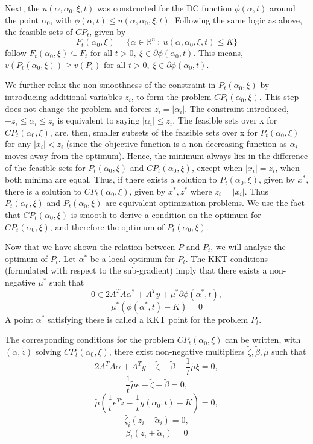 \documentclass[letterpaper, 10 pt, conference]{article}
\begin{document}
Next, the $u(\alpha, \alpha_0, \xi, t)$ was constructed for the DC function $\phi(\alpha, t)$ around the point $\alpha_0$, with $\phi(\alpha, t) \leq u(\alpha, \alpha_0, \xi, t)$. Following the same logic as above, the feasible sets of $CP_t$, given by $$F_t(\alpha_0, \xi) = \{ \alpha \in \mathbb{R}^n \ :\ u(\alpha, \alpha_0, \xi, t) \leq K \}$$ follow $F_t(\alpha_0, \xi) \subseteq F_t \text{ for all } t > 0,\  \xi \in \partial\phi(\alpha_0, t)$. This means, $v(P_t(\alpha_0, \xi)) \geq v(P_t)\text{ for all } t > 0,\  \xi \in \partial\phi(\alpha_0, t)$.

We further relax the non-smoothness of the constraint in $P_t(\alpha_0, \xi)$ by introducing additional variables $z_i$, to form the problem $CP_t(\alpha_0, \xi)$. This step does not change the problem and forces $z_i = |\alpha_i|$. The constraint introduced, $-z_i \leq \alpha_i \leq z_i$ is equivalent to saying $|\alpha_i| \leq z_i$. The feasible sets over x for $CP_t(\alpha_0, \xi)$, are, then, smaller subsets of the feasible sets over x for $P_t(\alpha_0, \xi)$ for any $|x_i| < z_i$ (since the objective function is a non-decreasing function as $\alpha_i$ moves away from the optimum). Hence, the minimum always lies in the difference of the feasible sets for $P_t(\alpha_0, \xi)$ and $CP_t(\alpha_0, \xi)$, except when $|x_i| = z_i$, when both minima are equal. Thus, if there exists a solution to $P_t(\alpha_0, \xi)$, given by $x^*$, there is a solution to $CP_t(\alpha_0, \xi)$, given by $x^*, z^*$ where $z_i = |x_i|$. Thus $P_t(\alpha_0, \xi)$ and $P_t(\alpha_0, \xi)$ are equivalent optimization problems. We use the fact that $CP_t(\alpha_0, \xi)$ is smooth to derive a condition on the optimum for $CP_t(\alpha_0, \xi)$, and therefore the optimum of $P_t(\alpha_0, \xi)$.

Now that we have shown the relation between $P$ and $P_t$, we will analyse the optimum of $P_t$. Let $\alpha^*$ be a local optimum for $P_t$. The KKT conditions (formulated with respect to the sub-gradient) imply that there exists a non-negative $\mu^*$ such that
$$0 \in 2A^TA\alpha^* + A^Ty + \mu^* \partial \phi(\alpha^*, t),$$
$$\mu^* (\phi(\alpha^*, t) - K) = 0$$
A point $\alpha^*$ satisfying these is called a KKT point for the problem $P_t$. 

The corresponding conditions for the problem $CP_t(\alpha_0, \xi)$ can be written, with $(\tilde{\alpha}, \tilde{z})$ solving $CP_t(\alpha_0, \xi)$, there exist non-negative multipliers $\tilde{\zeta}, \tilde{\beta}, \tilde{\mu}$ such that
$$2A^TA\tilde{\alpha} + A^Ty + \tilde{\zeta} - \tilde{\beta} - \frac{1}{t}\tilde{\mu}\xi = 0,$$
$$\frac{1}{t}\tilde{\mu}e - \tilde{\zeta} - \tilde{\beta} = 0,$$
$$\tilde{\mu} \left( \frac{1}{t} e^T \tilde{z} - \frac{1}{t} g(\alpha_0, t) - K \right) = 0,$$
$$\tilde{\zeta_i} (z_i - \tilde{\alpha}_i) = 0,$$
$$\tilde{\beta_i} (z_i + \tilde{\alpha}_i) = 0$$
\end{document}
